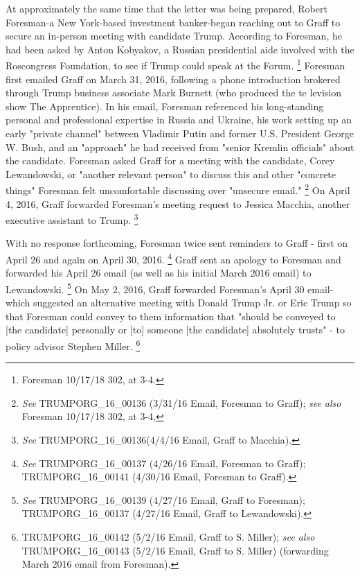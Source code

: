 At approximately the same time that the letter was being prepared, Robert Foresman-a New York-based investment banker-began reaching out to Graff to secure an in-person meeting with candidate Trump.
According to Foresman, he had been asked by Anton Kobyakov, a Russian presidential aide involved with the Roscongress Foundation, to see if Trump could speak at the Forum.%
\footnote{Foresman 10/17/18 302, at 3-4.}
Foresman first emailed Graff on March 31, 2016, following a phone introduction brokered through Trump business associate Mark Burnett (who produced the te levision show The Apprentice).
In his email, Foresman referenced his long-standing personal and professional expertise in Russia and Ukraine, his work setting up an early "private channel" between Vladimir Putin and former U.S. President George W. Bush, and an "approach" he had received from "senior Kremlin officials" about the candidate.
Foresman asked Graff for a meeting with the candidate, Corey Lewandowski, or "another relevant person" to discuss this and other "concrete things" Foresman felt uncomfortable discussing over "unsecure email."%
\footnote{\textit{See} TRUMPORG\_16\_00136 (3/31/16 Email, Foresman to Graff);
\textit{see also} Foresman 10/17/18 302, at 3-4,}
On April 4, 2016, Graff forwarded Foresman's meeting request to Jessica Macchia, another executive assistant to Trump.%
\footnote{\textit{See} TRUMPORG\_16\_00136(4/4/16 Email, Graff to Macchia).}

With no response forthcoming, Foresman twice sent reminders to Graff - first on April 26 and again on April 30, 2016.%
\footnote{\textit{See} TRUMPORG\_16\_00137 (4/26/16 Email, Foresman to Graff);
TRUMPORG\_16\_00141 (4/30/16 Email, Foresman to Graff).}
Graff sent an apology to Foresman and forwarded his April 26 email (as well as his initial March 2016 email) to Lewandowski.%
\footnote{\textit{See} TRUMPORG\_16\_00139 (4/27/16 Email, Graff to Foresman);
TRUMPORG\_16\_00137 (4/27/16 Email, Graff to Lewandowski).}
On May 2, 2016, Graff forwarded Foresman's April 30 email-which suggested an alternative meeting with Donald Trump Jr. or Eric Trump so that Foresman could convey to them information that "should be conveyed to [the candidate] personally or [to] someone [the candidate] absolutely trusts" - to policy advisor Stephen Miller.%
\footnote{TRUMPORG\_16\_00142 (5/2/16 Email, Graff to S. Miller);
\textit{see also} TRUMPORG\_16\_00143 (5/2/16 Email, Graff to S. Miller) (forwarding March 2016 email from Foresman).}

